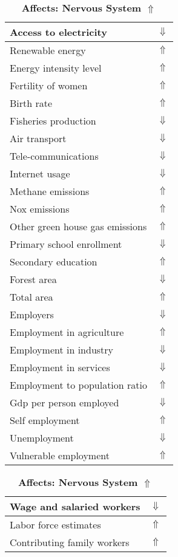 \documentclass[12pt,notitlepage,oneside]{report}
\begin{document}
\begin{table}[!htb]
\caption{\textbf{Affects: Nervous System $\Uparrow$}}
\centering
\label{Correlated Socio-economic Factors0}
\begin{tabular}{|l|l|}
\hline
Access to electricity & $\Downarrow$\\ \hline
Renewable energy & $\Uparrow$\\ \hline
Energy intensity level & $\Uparrow$\\ \hline
Fertility of women & $\Uparrow$\\ \hline
Birth rate & $\Uparrow$\\ \hline
Fisheries production & $\Downarrow$\\ \hline
Air transport  & $\Downarrow$\\ \hline
Tele-communications & $\Downarrow$\\ \hline
Internet usage & $\Downarrow$\\ \hline
Methane emissions & $\Uparrow$\\ \hline
Nox emissions & $\Uparrow$\\ \hline
Other green house gas emissions & $\Uparrow$\\ \hline
Primary school enrollment & $\Downarrow$\\ \hline
Secondary education & $\Uparrow$\\ \hline
Forest area & $\Downarrow$\\ \hline
Total area & $\Uparrow$\\ \hline
Employers & $\Downarrow$\\ \hline
Employment in agriculture & $\Uparrow$\\ \hline
Employment in industry & $\Downarrow$\\ \hline
Employment in services & $\Downarrow$\\ \hline
Employment to population ratio & $\Uparrow$\\ \hline
Gdp per person employed & $\Downarrow$\\ \hline
Self employment & $\Uparrow$\\ \hline
Unemployment & $\Downarrow$\\ \hline
Vulnerable employment & $\Uparrow$\\ \hline
\end{tabular}
\begin{tabular}{|l|l|}
\hline
Wage and salaried workers & $\Downarrow$\\ \hline
Labor force estimates & $\Uparrow$\\ \hline
Contributing family workers & $\Uparrow$\\ \hline

\end{tabular}
\end{table}
\end{document}
